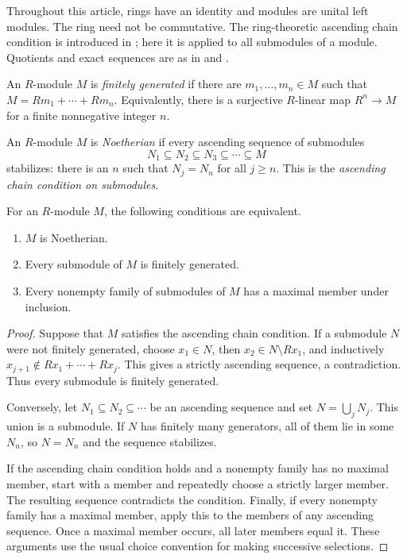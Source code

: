 Throughout this article, rings have an identity and modules are unital left modules. The ring need not be commutative. The ring-theoretic ascending chain condition is introduced in ; here it is applied to all submodules of a module. Quotients and exact sequences are as in  and .

\begin{definition}\label{def-finitely-generated-module}
An $R$-module $M$ is \emph{finitely generated} if there are $m_1,\ldots,m_n\in M$ such that $M=Rm_1+\cdots+Rm_n$. Equivalently, there is a surjective $R$-linear map $R^n\to M$ for a finite nonnegative integer $n$.
\end{definition}

\begin{definition}\label{def-noetherian-module}
An $R$-module $M$ is \emph{Noetherian} if every ascending sequence of submodules
\[
N_1\subseteq N_2\subseteq N_3\subseteq\cdots\subseteq M
\]
stabilizes: there is an $n$ such that $N_j=N_n$ for all $j\ge n$. This is the \emph{ascending chain condition on submodules}.
\end{definition}

\begin{proposition}\label{prop-noetherian-equivalences}
For an $R$-module $M$, the following conditions are equivalent.
\begin{enumerate}
\item $M$ is Noetherian.
\item Every submodule of $M$ is finitely generated.
\item Every nonempty family of submodules of $M$ has a maximal member under inclusion.
\end{enumerate}
\end{proposition}
\begin{proof}\label{proof-noetherian-equivalences}
Suppose that $M$ satisfies the ascending chain condition. If a submodule $N$ were not finitely generated, choose $x_1\in N$, then $x_2\in N\setminus Rx_1$, and inductively $x_{j+1}\notin Rx_1+\cdots+Rx_j$. This gives a strictly ascending sequence, a contradiction. Thus every submodule is finitely generated.

Conversely, let $N_1\subseteq N_2\subseteq\cdots$ be an ascending sequence and set $N=\bigcup_jN_j$. This union is a submodule. If $N$ has finitely many generators, all of them lie in some $N_n$, so $N=N_n$ and the sequence stabilizes.

If the ascending chain condition holds and a nonempty family has no maximal member, start with a member and repeatedly choose a strictly larger member. The resulting sequence contradicts the condition. Finally, if every nonempty family has a maximal member, apply this to the members of any ascending sequence. Once a maximal member occurs, all later members equal it. These arguments use the usual choice convention for making successive selections.
\end{proof}

